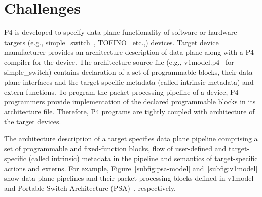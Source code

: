 \documentclass[10pt,sigconf,letterpaper,anonymous]{acmart}
\begin{document}



\maketitle





\section{Challenges}
P4 is developed to specify data plane functionality of software or hardware targets (e.g., simple\_\-switch~\cite{simple_switch.md}, TOFINO~\cite{tofino} etc.,) devices.
Target device manufacturer provides an architecture description of data plane along with a P4 compiler for the device.
The architecture source file (e.g., v1model.p4~\cite{v1model.p4} for simple\_switch) contains declaration of a set of pro\-gram\-ma\-ble blocks, their data plane interfaces and the target specific metadata (called intrinsic metadata) and extern functions.
To program the packet processing pipeline of a device, P4 programmers provide implementation of the declared programmable blocks in its architecture file.
Therefore, P4 programs are tightly coupled with architecture of the target devices.


The architecture description of a target specifies data plane pipeline comprising a set of pro\-gram\-ma\-ble and fixed-function blocks, flow of user-defined and target-specific (called intrinsic) metadata in the pipeline and semantics of target-specific actions and externs.
For example, Figure~\ref{subfig:psa-model} and~\ref{subfig:v1model} show data plane pipelines and their packet processing blocks defined in v1model~\cite{simple_switch.md} and Portable Switch Architecture (PSA)~\cite{psa}, respectively.
\end{document}
